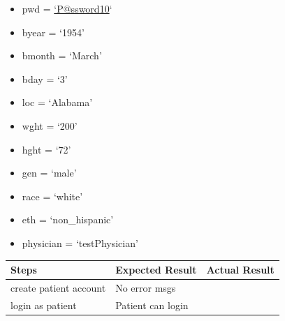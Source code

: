 \documentclass[letterpaper,10pt,english]{sphinxmanual}
\begin{document}
\begin{fulllineitems}
\begin{itemize}
\item {} 
pwd = \href{mailto:'P@ssword10}{`P@ssword10}`

\item {} 
byear = `1954'

\item {} 
bmonth = `March'

\item {} 
bday = `3'

\item {} 
loc = `Alabama'

\item {} 
wght = `200'

\item {} 
hght = `72'

\item {} 
gen = `male'

\item {} 
race = `white'

\item {} 
eth = `non\_hispanic'

\item {} 
physician = `testPhysician'

\end{itemize}

\begin{tabulary}{\linewidth}{|L|L|L|}
\hline
\textsf{\relax 
Steps
} & \textsf{\relax 
Expected Result
} & \textsf{\relax 
Actual Result
}\\
\hline
create patient account
 & 
No error msgs
 & \\
\hline
login as patient
 & 
Patient can login
 & \\
\hline\end{tabulary}


\end{fulllineitems}

\end{document}
